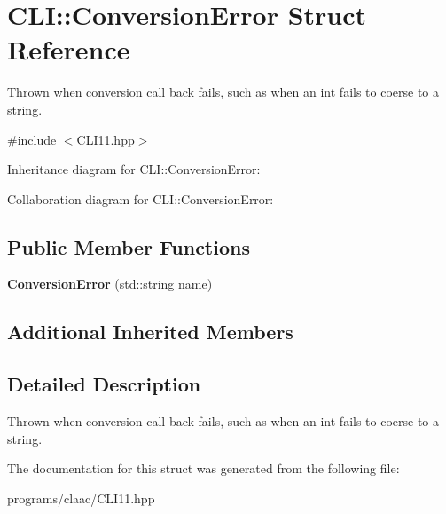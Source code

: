 \hypertarget{struct_c_l_i_1_1_conversion_error}{}\section{C\+LI\+:\+:Conversion\+Error Struct Reference}
\label{struct_c_l_i_1_1_conversion_error}


Thrown when conversion call back fails, such as when an int fails to coerse to a string.  




{\ttfamily \#include $<$C\+L\+I11.\+hpp$>$}



Inheritance diagram for C\+LI\+:\+:Conversion\+Error\+:


Collaboration diagram for C\+LI\+:\+:Conversion\+Error\+:
\subsection*{Public Member Functions}
\begin{DoxyCompactItemize}
\item 
\mbox{\label{struct_c_l_i_1_1_conversion_error_a34cb19ea419b1730924966ca774788f0}} 
{\bfseries Conversion\+Error} (std\+::string name)
\end{DoxyCompactItemize}
\subsection*{Additional Inherited Members}


\subsection{Detailed Description}
Thrown when conversion call back fails, such as when an int fails to coerse to a string. 

The documentation for this struct was generated from the following file\+:\begin{DoxyCompactItemize}
\item 
programs/claac/C\+L\+I11.\+hpp\end{DoxyCompactItemize}
